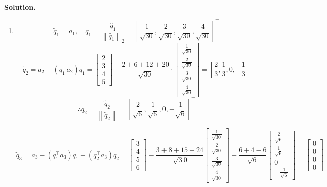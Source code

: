 \documentclass[english,onecolumn]{IEEEtran}
\begin{document}
\noindent
\textbf{Solution.}
\begin{enumerate}
\item
$$
\tilde{q}_{1}=a_{1}, \quad q_{1}=\frac{\hat{q}_{1}}{\left\|\hat{q}_{1}\right\|_{2}}=\left[\frac{1}{\sqrt{30} }, \frac{2}{\sqrt{30}}, \frac{3}{\sqrt{30}}, \frac{4}{\sqrt{30}}\right]^{\top}
$$
$$
\tilde{q}_{2}=a_{2}-\left(q_{1}^{\top} a_{2}\right) q_{1}=\left[\begin{array}{c}
2 \\
3 \\
4 \\
5
\end{array}\right]-\frac{2+6+12+20}{\sqrt{30}} \cdot\left[\begin{array}{c}
\frac{1}{\sqrt{30}} \\
\frac{2}{\sqrt{30}} \\
\frac{3}{\sqrt{30}} \\
\frac{4}{\sqrt{30}}
\end{array}\right]=\left[\frac{2}{3}, \frac{1}{3}, 0,-\frac{1}{3}\right]
$$
$$
\therefore q_{2}=\frac{\tilde{q}_{2}}{\left\|\tilde{q}_{2}\right\|}=\left[\frac{2}{\sqrt{6}}, \frac{1}{\sqrt{6}}, 0,-\frac{1}{\sqrt{6}}\right]^{\top}
$$

$$
\tilde{q}_{3}=a_{3}-\left(q_{1}^{\top} a_{3}\right) q_{1}-\left(q_{2}^{\top} a_{3}\right) q_{2}=\left[\begin{array}{l}
3 \\
4 \\
5 \\
6
\end{array}\right]-\frac{3+8+15+24}{\sqrt{3} 0}\left[\begin{array}{c}
\frac{1}{\sqrt{30}} \\
\frac{2}{\sqrt{30}} \\
\frac{3}{\sqrt{30}} \\
\frac{4}{\sqrt{30}}
\end{array}\right]-\frac{6+4-6}{\sqrt{6}}\left[\begin{array}{c}
\frac{2}{\sqrt{6}} \\
\frac{1}{\sqrt{6}} \\
0 \\
-\frac{1}{\sqrt{6}}
\end{array}\right]=\left[\begin{array}{c}
0 \\
0 \\
0 \\
0
\end{array}\right]
$$


\end{enumerate}
\end{document}
